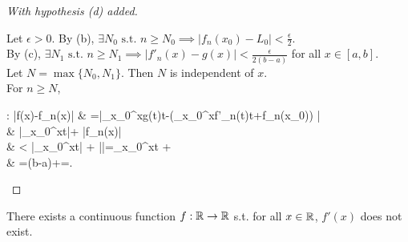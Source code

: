\begin{thm}[17]
\begin{proof}[With hypothesis (d) added]
\begin{enumerate}[label=\arabic*.]
			      Let $\epsilon>0$.
			      By (b), $\exists{N_0} \text{ s.t. } n\ge N_0 \implies \left|f_{n}(x_0)-L_0\right|<\frac{\epsilon}{2}$.\\
			      By (c), $\exists{N_1} \text{ s.t. } n\ge N_1 \implies \left|f'_{n}(x)-g(x)\right|<\frac{\epsilon}{2(b-a)}$ for all $x \in [a,b]$.\\
			      Let $N=\max\{N_0,N_1\}$.
			      Then $N$ is independent of $x$. \\
			      For $n\ge N$,
			      \begin{flalign*}
				      : \left|f(x)-f_{n}(x)\right| & =\left|\int_{x_0}^{x}{g(t)t}-\left(\int_{x_0}^{x}{f'_{n}(t)t}+f_{n}(x_0)\right) \right|                                                                 \\
				                                                       & \le  \left|\int_{x_0}^{x}{\left[ g(t)-f'_{n}(t) \right] t}\right|+ \left|f_{n}(x)\right|                                                                          \\
				                                                       & < \left|\int_{x_0}^{x}{t}\right| + \left|\right|=\int_{x_0}^{x}{t} +  \\
				                                                       & =\cdot (b-a)+=\epsilon.
			      \end{flalign*}
		\end{enumerate}
	\end{proof}
\end{thm}
\begin{thm}[18]
	There exists a continuous function $f: \mathbb{R}\to \mathbb{R}$ s.t. for all $x \in \mathbb{R}$, $f'(x)$ does not exist.
\end{thm}
